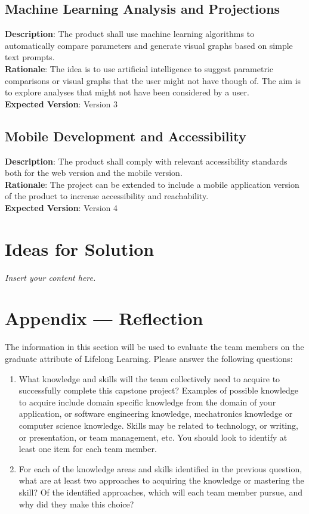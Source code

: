\documentclass[12pt]{article}
\newcommand{\lips}{\textit{Insert your content here.}}
\begin{document}
\subsection{Machine Learning Analysis and Projections}
\textbf{Description}: The product shall use machine learning algorithms to
automatically compare parameters and generate visual graphs based on simple text
prompts.\\
\textbf{Rationale}: The idea is to use artificial intelligence to suggest
parametric comparisons or visual graphs that the user might not have though of.
The aim is to explore analyses that might not have been considered by a user.\\
\textbf{Expected Version}: Version 3

\subsection{Mobile Development and Accessibility}
\textbf{Description}: The product shall comply with relevant accessibility
standards both for the web version and the mobile version.\\
\textbf{Rationale}: The project can be extended to include a mobile application
version of the product to increase accessibility and reachability.\\
\textbf{Expected Version}: Version 4

\section{Ideas for Solution}
\lips

\newpage{}
\section*{Appendix --- Reflection}

The information in this section will be used to evaluate the team members on the
graduate attribute of Lifelong Learning.  Please answer the following questions:

\begin{enumerate}
  \item What knowledge and skills will the team collectively need to acquire to
  successfully complete this capstone project?  Examples of possible knowledge
  to acquire include domain specific knowledge from the domain of your
  application, or software engineering knowledge, mechatronics knowledge or
  computer science knowledge.  Skills may be related to technology, or writing,
  or presentation, or team management, etc.  You should look to identify at
  least one item for each team member.
  \item For each of the knowledge areas and skills identified in the previous
  question, what are at least two approaches to acquiring the knowledge or
  mastering the skill?  Of the identified approaches, which will each team
  member pursue, and why did they make this choice?
\end{enumerate}
\end{document}
